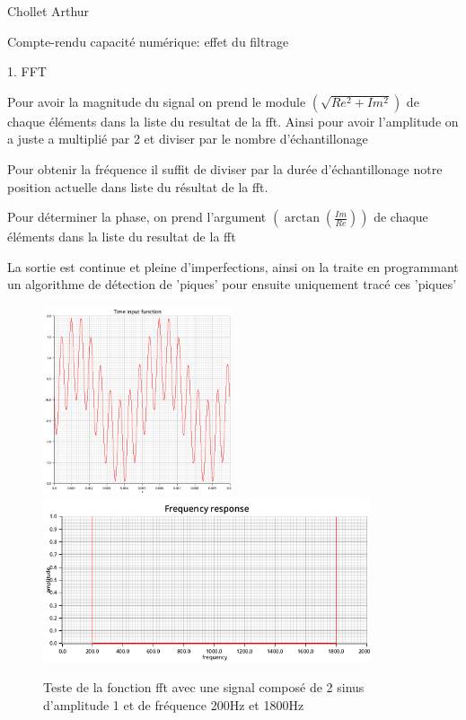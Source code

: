 \documentclass{article}
\newcommand{\expart}[1]
{
    \begin{largeUnderline}#1\end{largeUnderline}\par
}
\begin{document}
Chollet Arthur

\begin{center}
    \Huge
    \normalfont\calligra Compte-rendu capacité numérique: effet du filtrage
\end{center}

\expart{1. FFT}

Pour avoir la magnitude du signal on prend le module $\left(\sqrt{Re^2 + Im^2}\right)$ de chaque éléments dans la liste du resultat de la fft. Ainsi pour avoir l'amplitude on a juste a multiplié par 2 et diviser par le nombre d'échantillonage

Pour obtenir la fréquence il suffit de diviser par la durée d'échantillonage notre position actuelle dans liste du résultat de la fft.

Pour déterminer la phase, on prend l'argument $\left(\arctan\left(\frac{Im}{Re}\right)\right)$ de chaque éléments dans la liste du resultat de la fft 

La sortie est continue et pleine d'imperfections, ainsi on la traite en programmant un algorithme de détection de 'piques' pour ensuite uniquement tracé ces 'piques'

\begin{figure}[H]
  \centering
  \includegraphics[height=15em]{images/custom/fft_test/sin_time_input.png}
  \includegraphics[height=13em]{images/custom/fft_test/sin_fft_result.png}
  \caption{Teste de la fonction fft avec une signal composé de 2 sinus d'amplitude 1 et de fréquence 200Hz et 1800Hz}
\end{figure}
\end{document}
